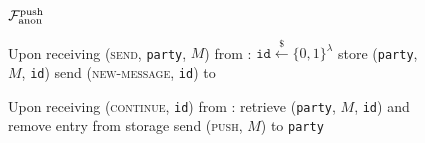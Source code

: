   \begin{figure}[H]
    \begin{systembox}{$\mathcal{F}_{\mathrm{anon}}^{\mathrm{push}}$}
      \begin{algorithmic}[1]
        \State Upon receiving (\textsc{send}, \texttt{party}, $M$) from \alice:
        \Indent
          \State $\mathtt{id} \overset{\$}{\gets} \{0, 1\}^{\lambda}$
          \State store (\texttt{party}, $M$, \texttt{id})
          \State send (\textsc{new-message}, \texttt{id}) to \adversary
        \EndIndent
        \Statex

        \State Upon receiving (\textsc{continue}, \texttt{id}) from \adversary:
        \Indent
          \State retrieve (\texttt{party}, $M$, \texttt{id}) and remove entry
          from storage
          \State send (\textsc{push}, $M$) to \texttt{party}
        \EndIndent
        \Statex
      \end{algorithmic}
    \end{systembox}
    \caption{}
    \label{alg:anonfunc:push}
  \end{figure}
